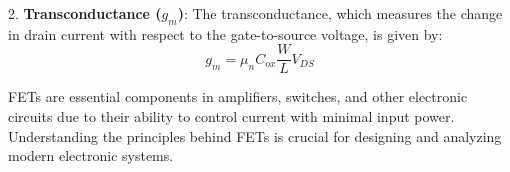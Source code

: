 2. \textbf{Transconductance (\(g_m\))}: The transconductance, which measures the change in drain current with respect to the gate-to-source voltage, is given by:
   \[
   g_m = \mu_n C_{ox} \frac{W}{L} V_{DS}
   \]

FETs are essential components in amplifiers, switches, and other electronic circuits due to their ability to control current with minimal input power. Understanding the principles behind FETs is crucial for designing and analyzing modern electronic systems.

